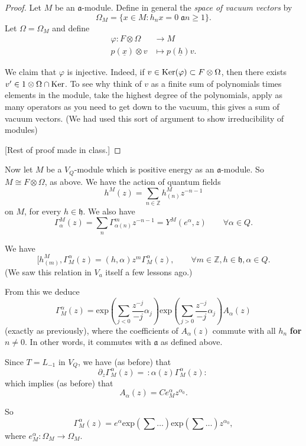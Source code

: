 \begin{proof}
Let $M$ be an $\mathfrak{a}$-module.
Define in general the {\it space of vacuum vectors} by
$$
\Omega_M=\{x \in M:h_nx=0\;\mathfrak{a}n\geq 1\}.
$$
Let $\Omega=\Omega_M$ and define
\begin{align*}
\varphi: F \otimes \Omega &\longrightarrow M \\
p(\underline{x})\otimes v &\longmapsto p(\underline{h})v.
\end{align*}

\noindent
We claim that $\varphi$ is injective. Indeed,
if $v \in \mathop{\mathrm{Ker}}(\varphi)\subset F \otimes \Omega$, then
there exists $v' \in 1 \otimes \Omega \cap \mathop{\mathrm{Ker}}$.
To see why think of $v$ as a finite sum of polynomials
times elements in the module, take the highest degree of the polynomials,
apply as many operators as you need to get down to the vacuum,
this gives a sum of vacuum vectors.
(We had used this sort of argument to show
irreducibility of modules)

[Rest of proof made in class.]
\end{proof}



\medskip\noindent
Now let $M$ be a $V_Q$-module which is positive 
energy as an $\mathfrak{a}$-module.
So $M \cong F \otimes \Omega$, as above.
We have the action of quantum fields
$$
h^M(z)=\sum_{n \in \mathbb{Z}}h_{(n)}^M z^{-n-1}
$$
on $M$, for every $h \in \mathfrak{h}$.
We also have
$$
\Gamma^M_\alpha(z)=\sum_n\Gamma^m_{\alpha(n)}z^{-n-1}
=Y^M(e^\alpha,z)\qquad \forall \alpha\in Q.
$$

We have
$$
[h^M_{(m)},\Gamma^\alpha_M(z)=
(h,\alpha)z^m\Gamma^\alpha_M(z),
\qquad \forall m \in \mathbb{Z},h \in \mathfrak{h}, \alpha \in Q.
$$
(We saw this relation in $V_a$ itself a few lessons ago.)

From this we deduce
$$
\Gamma^\alpha_M(z)=
\text{exp}\left(\sum_{j<0}\frac{z^{-j}}{-j}\alpha_j\right)
\text{exp}\left(\sum_{j>0}\frac{z^{-j}}{-j}\alpha_j\right)
A_\alpha(z)
$$
(exactly as previously),
where the coefficients of $A_\alpha(z)$ commute with all
$h_n$ {\bf for $n \neq 0$}.
In other words, it commutes with $\mathfrak{a}$ as defined above.

Since $T=L_{-1}$ in $V_Q$,
we have (as before) that
$$
\partial_z\Gamma^\alpha_M(z)=\,:\!\alpha(z)\Gamma^\alpha_M(z)\!:\,
$$
which implies (as before) that
$$
A_\alpha(z)=Ce_M^\alpha z^{\alpha_0}.
$$

So
$$
\Gamma^\alpha_M(z)=e^\alpha
\text{exp}(\sum\ldots)
\text{exp}(\sum\ldots)
z^{\alpha_0},
$$
where $e_M^\alpha:\Omega_M \to \Omega_M$.

